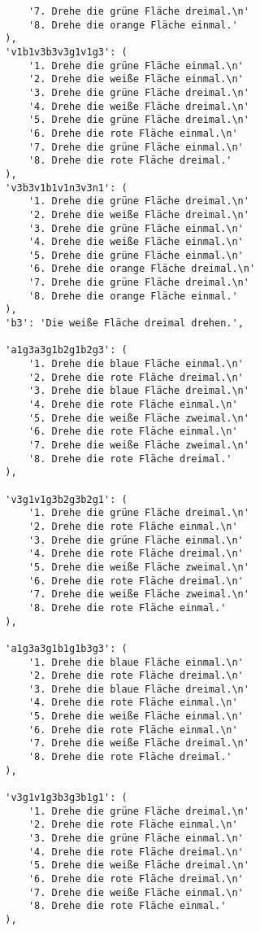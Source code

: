 \begin{lstlisting}
            '7. Drehe die grüne Fläche dreimal.\n'
            '8. Drehe die orange Fläche einmal.'
        ),
        'v1b1v3b3v3g1v1g3': (
            '1. Drehe die grüne Fläche einmal.\n'
            '2. Drehe die weiße Fläche einmal.\n'
            '3. Drehe die grüne Fläche dreimal.\n'
            '4. Drehe die weiße Fläche dreimal.\n'
            '5. Drehe die grüne Fläche dreimal.\n'
            '6. Drehe die rote Fläche einmal.\n'
            '7. Drehe die grüne Fläche einmal.\n'
            '8. Drehe die rote Fläche dreimal.'
        ),
        'v3b3v1b1v1n3v3n1': (
            '1. Drehe die grüne Fläche dreimal.\n'
            '2. Drehe die weiße Fläche dreimal.\n'
            '3. Drehe die grüne Fläche einmal.\n'
            '4. Drehe die weiße Fläche einmal.\n'
            '5. Drehe die grüne Fläche einmal.\n'
            '6. Drehe die orange Fläche dreimal.\n'
            '7. Drehe die grüne Fläche dreimal.\n'
            '8. Drehe die orange Fläche einmal.'
        ),
        'b3': 'Die weiße Fläche dreimal drehen.',
        
        'a1g3a3g1b2g1b2g3': (
            '1. Drehe die blaue Fläche einmal.\n'
            '2. Drehe die rote Fläche dreimal.\n'
            '3. Drehe die blaue Fläche dreimal.\n'
            '4. Drehe die rote Fläche einmal.\n'
            '5. Drehe die weiße Fläche zweimal.\n'
            '6. Drehe die rote Fläche einmal.\n'
            '7. Drehe die weiße Fläche zweimal.\n'
            '8. Drehe die rote Fläche dreimal.'
        ),

        'v3g1v1g3b2g3b2g1': (
            '1. Drehe die grüne Fläche dreimal.\n'
            '2. Drehe die rote Fläche einmal.\n'
            '3. Drehe die grüne Fläche einmal.\n'
            '4. Drehe die rote Fläche dreimal.\n'
            '5. Drehe die weiße Fläche zweimal.\n'
            '6. Drehe die rote Fläche dreimal.\n'
            '7. Drehe die weiße Fläche zweimal.\n'
            '8. Drehe die rote Fläche einmal.'
        ),

        'a1g3a3g1b1g1b3g3': (
            '1. Drehe die blaue Fläche einmal.\n'
            '2. Drehe die rote Fläche dreimal.\n'
            '3. Drehe die blaue Fläche dreimal.\n'
            '4. Drehe die rote Fläche einmal.\n'
            '5. Drehe die weiße Fläche einmal.\n'
            '6. Drehe die rote Fläche einmal.\n'
            '7. Drehe die weiße Fläche dreimal.\n'
            '8. Drehe die rote Fläche dreimal.'
        ),

        'v3g1v1g3b3g3b1g1': (
            '1. Drehe die grüne Fläche dreimal.\n'
            '2. Drehe die rote Fläche einmal.\n'
            '3. Drehe die grüne Fläche einmal.\n'
            '4. Drehe die rote Fläche dreimal.\n'
            '5. Drehe die weiße Fläche dreimal.\n'
            '6. Drehe die rote Fläche dreimal.\n'
            '7. Drehe die weiße Fläche einmal.\n'
            '8. Drehe die rote Fläche einmal.'
        ),


\end{lstlisting}
